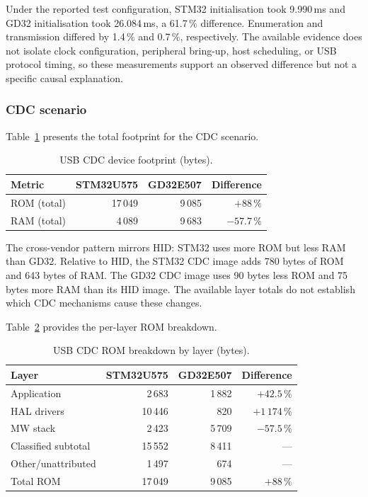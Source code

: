 Under the reported test configuration, STM32 initialisation took 9.990\,ms and GD32
initialisation took 26.084\,ms, a 61.7\,\% difference. Enumeration and transmission differed
by 1.4\,\% and 0.7\,\%, respectively. The available evidence does not isolate clock
configuration, peripheral bring-up, host scheduling, or USB protocol timing, so these
measurements support an observed difference but not a specific causal explanation.

\subsubsection{CDC scenario}
\label{sec:gd32-usb-cdc}

Table~\ref{tab:gd32-usb-cdc-footprint} presents the total footprint for the CDC scenario.

\begin{table}[H]
  \centering
  \caption{USB CDC device footprint (bytes).}
  \label{tab:gd32-usb-cdc-footprint}
  \begin{tabular}{l r r r}
    \toprule
    \textbf{Metric} & \textbf{STM32U575} & \textbf{GD32E507} & \textbf{Difference} \\
    \midrule
    ROM (total) & 17\,049 & 9\,085  & $+88\,\%$ \\
    RAM (total) & 4\,089  & 9\,683  & $-57.7\,\%$ \\
    \bottomrule
  \end{tabular}
\end{table}

The cross-vendor pattern mirrors HID: STM32 uses more ROM but less RAM than GD32. Relative
to HID, the STM32 CDC image adds 780 bytes of ROM and 643 bytes of RAM. The GD32 CDC image
uses 90 bytes less ROM and 75 bytes more RAM than its HID image. The available layer totals
do not establish which CDC mechanisms cause these changes.

Table~\ref{tab:gd32-usb-cdc-rom} provides the per-layer ROM breakdown.

\begin{table}[H]
  \centering
  \caption{USB CDC ROM breakdown by layer (bytes).}
  \label{tab:gd32-usb-cdc-rom}
  \begin{tabular}{l r r r}
    \toprule
    \textbf{Layer} & \textbf{STM32U575} & \textbf{GD32E507} & \textbf{Difference} \\
    \midrule
    Application    & 2\,683  & 1\,882 & $+42.5\,\%$ \\
    HAL drivers    & 10\,446 & 820    & $+1\,174\,\%$ \\
    MW stack       & 2\,423  & 5\,709 & $-57.5\,\%$ \\
    Classified subtotal & 15\,552 & 8\,411 & --- \\
    Other/unattributed  & 1\,497 & 674 & --- \\
    \midrule
    Total ROM       & 17\,049 & 9\,085 & $+88\,\%$ \\
    \bottomrule
  \end{tabular}
\end{table}

